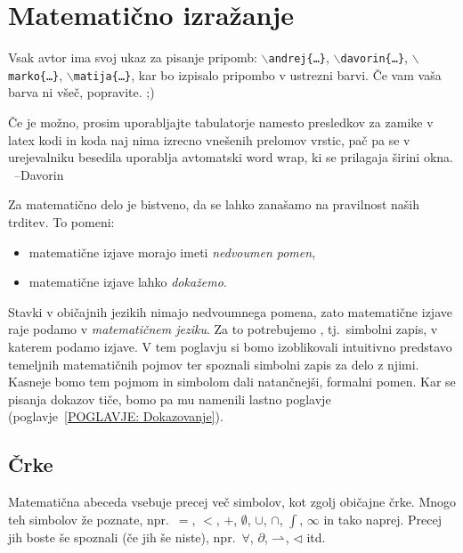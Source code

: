 \chapter{Matematično izražanje}\label{POGLAVJE: Matematično izražanje}


	\alert{Vsak avtor ima svoj ukaz za pisanje pripomb: \textcolor{andrejcolor}{\texttt{$\backslash$andrej\{\ldots\}}}, \textcolor{davorincolor}{\texttt{$\backslash$davorin\{\ldots\}}}, \textcolor{markocolor}{\texttt{$\backslash$marko\{\ldots\}}}, \textcolor{matijacolor}{\texttt{$\backslash$matija\{\ldots\}}}, kar bo izpisalo pripombo v ustrezni barvi. Če vam vaša barva ni všeč, popravite. ;)}
	
	
	\alert{Če je možno, prosim uporabljajte tabulatorje namesto presledkov za zamike v latex kodi in koda naj nima izrecno vnešenih prelomov vrstic, pač pa se v urejevalniku besedila uporablja avtomatski word wrap, ki se prilagaja širini okna. \ --Davorin}
	
	Za matematično delo je bistveno, da se lahko zanašamo na pravilnost naših trditev. To pomeni:
	\begin{itemize}
		\item
			matematične izjave morajo imeti \emph{nedvoumen pomen},
		\item
			matematične izjave lahko \emph{dokažemo}.
	\end{itemize}
	
	Stavki v običajnih jezikih nimajo nedvoumnega pomena, zato matematične izjave raje podamo v \emph{matematičnem jeziku}. Za to potrebujemo , tj.~simbolni zapis, v katerem podamo izjave. V tem poglavju si bomo izoblikovali intuitivno predstavo temeljnih matematičnih pojmov ter spoznali simbolni zapis za delo z njimi. Kasneje bomo tem pojmom in simbolom dali natančnejši, formalni pomen. Kar se pisanja dokazov tiče, bomo pa mu namenili lastno poglavje (poglavje~\ref{POGLAVJE: Dokazovanje}).
	
	
	\section{Črke}
	
		Matematična abeceda vsebuje precej več simbolov, kot zgolj običajne črke. Mnogo teh simbolov že poznate, npr.~$=$, $<$, $+$, $\emptyset$, $\cup$, $\cap$, $\int$, $\infty$ in tako naprej. Precej jih boste še spoznali (če jih še niste), npr.~$\forall$, $\partial$, $\mathrel{\rightharpoonup}$, $\lhd$ itd.
		
